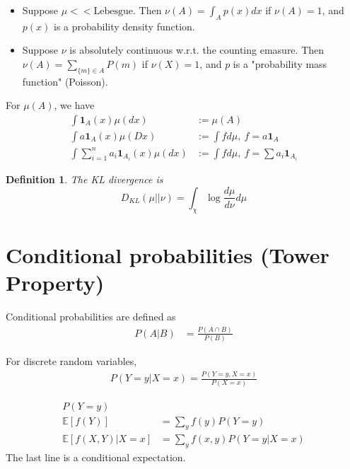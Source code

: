 \documentclass{article}
\newtheorem*{defn}{Definition}
\newcommand{\E}{\mathbb{E}}
\begin{document}
\begin{itemize}
  \item Suppose $\mu << \text{Lebesgue}$. Then $\nu(A) = \int_A p(x) dx$ if $\nu(A) =
1$, and $p(x)$ is a probability density function.

  \item Suppose $\nu$ is absolutely continuous w.r.t. the counting emasure. Then $\nu(A)
= \sum_{\{m\} \in A} P(m)$ if $\nu(X) = 1$, and $p$ is a "probability mass
function" (Poisson).
\end{itemize}

For $\mu(A)$, we have
\begin{align*}
   \int \mathbf{1}_A(x) \mu(dx) &:= \mu(A) \\
   \int a \mathbf{1}_A(x) \mu(Dx) &:= \int f d\mu,\ f = a \mathbf{1}_A \\
   \int \sum_{i=1}^n a_i \mathbf{1}_{A_i}(x) \mu(dx) &:= \int f d\mu,\ f = \sum
   a_i \mathbf{1}_{A_i}
\end{align*}

\begin{defn}
  The KL divergence is
  \[ D_{KL}(\mu || \nu) = \int_\chi \log \frac{d\mu}{d\nu} d\mu \]
\end{defn}

\section{Conditional probabilities (Tower Property)}
Conditional probabilities are defined as
\begin{align*}
  P(A | B) &= \frac{P(A \cap B)}{P(B)} 
\end{align*}

For discrete random variables,
\begin{align*}
  P(Y = y | X = x) = \frac{P(Y = y, X = x)}{P(X = x)}
\end{align*}

\begin{align*}
  P(Y = y) \\
  \E[f(Y)] &= \sum_y f(y) P(Y = y) \\
  \E[f(X, Y) | X = x] &= \sum_y f(x, y) P(Y = y | X = x)
\end{align*}
The last line is a conditional expectation.
\end{document}
